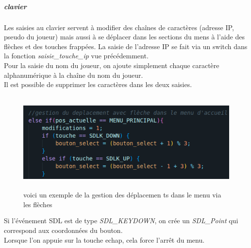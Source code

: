 \documentclass[11pt]{article}
\begin{document}
                    \subparagraph{clavier}\leavevmode\newline
                    Les saisies au clavier servent à modifier des chaînes de caractères (adresse IP, pseudo du joueur) mais aussi à se déplacer dans les sections du mens à l’aide des flèches et des touches frappées. La saisie de l’adresse IP se fait via un switch dans la fonction \textit{saisie\_touche\_ip} vue précédemment. \\
                    Pour la saisie du nom du joueur, on ajoute simplement chaque caractère alphanumérique à la chaîne du nom du joueur. \\
                    Il est possible de supprimer les caractères dans les deux saisies.\\

                    \begin{figure}[H]
                        \centering
                        \includegraphics[height=5cm]{codeMenu.png}
                        \caption{voici un exemple de la gestion des déplacemen ts dans le menu via les flèches}
                        \label{fig:codeMenu}
                    \end{figure}
                    Si l’événement SDL est de type \textit{SDL\_KEYDOWN}, on crée un \textit{SDL\_Point} qui correspond aux coordonnées du bouton. \\
                    Lorsque l’on appuie sur la touche echap, cela force l’arrêt du menu.
\end{document}
